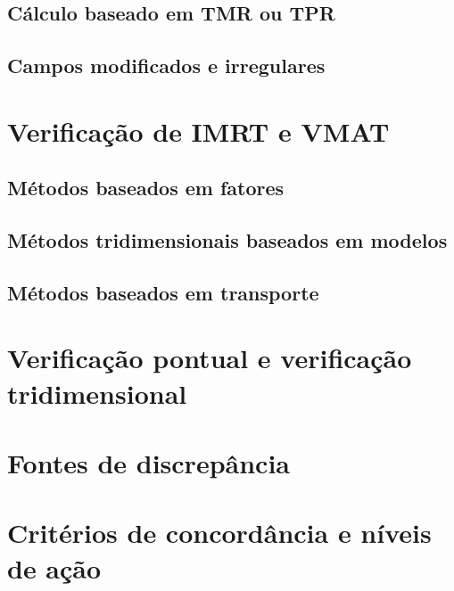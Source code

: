 \subsection{Cálculo baseado em TMR ou TPR}
\label{ssec:calculo_tmr_tpr}

\subsection{Campos modificados e irregulares}
\label{ssec:campos_modificados_verificacao}

\section{Verificação de IMRT e VMAT}
\label{sec:verificacao_modulados}

\subsection{Métodos baseados em fatores}
\label{ssec:verificacao_fatores}

\subsection{Métodos tridimensionais baseados em modelos}
\label{ssec:verificacao_modelos}

\subsection{Métodos baseados em transporte}
\label{ssec:verificacao_transporte}

\section{Verificação pontual e verificação tridimensional}
\label{sec:verificacao_pontual_3d}

\section{Fontes de discrepância}
\label{sec:fontes_discrepancia}

\section{Critérios de concordância e níveis de ação}
\label{sec:criterios_concordancia}


